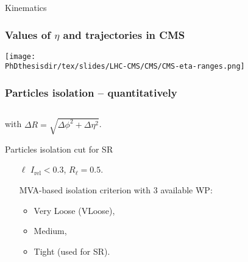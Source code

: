 \begin{frame}
\begin{block}{Kinematics}
\begin{minipage}{.55\linewidth}
\begin{center}
{}
\end{center}
\end{minipage}
\end{block}

\end{frame}

\begin{frame}
\frametitle{Values of $\eta$ and trajectories in CMS}
\begin{center}
\texttt{[image: \\PhDthesisdir/tex/slides/LHC-CMS/CMS/CMS-eta-ranges.png]}
\end{center}
\end{frame}



\begin{frame}\addtocounter{framenumber}{-1}
\frametitle{Particles isolation -- quantitatively}
\begin{block}{}
\begin{equation*}

\end{equation*}
\begin{center}
with $\Delta R = \sqrt{\Delta\phi^2+\Delta\eta^2}$.
\end{center}
\end{block}
\pause
\begin{block}{Particles isolation cut for SR}
\begin{itemize}
\item[$\ell$] $I_\text{rel}<\num{0.3}$,
$R_\ell = \num{0.5}$.
\item[\tauh] MVA-based isolation criterion with 3 available WP:
\begin{itemize}
\item Very Loose (VLoose),
\item Medium,
\item Tight (used for SR).
\end{itemize}
\end{itemize}
\end{block}
\end{frame}

